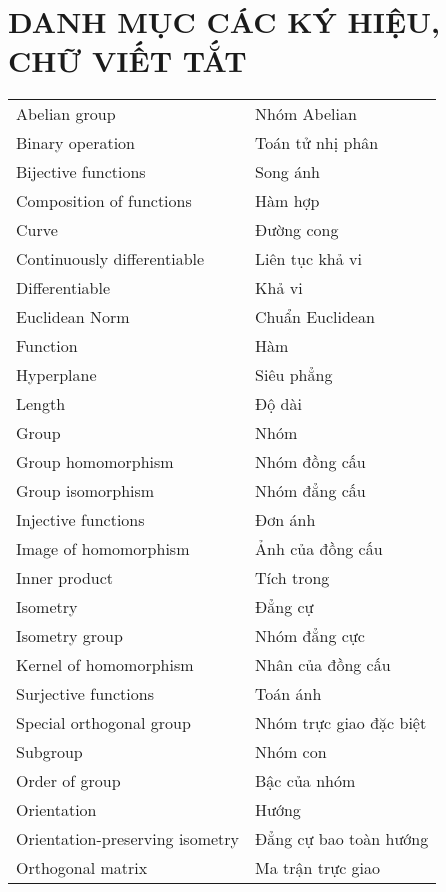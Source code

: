 \chapter*{DANH MỤC CÁC KÝ HIỆU, CHỮ VIẾT TẮT}
\begin{center}
	\begin{longtable}{ l  l }
            Abelian group & Nhóm Abelian\\
            Binary operation & Toán tử nhị phân\\
            Bijective functions & Song ánh\\
            Composition of functions & Hàm hợp\\
            Curve & Đường cong\\
            Continuously differentiable & Liên tục khả vi\\
            Differentiable & Khả vi\\
            Euclidean Norm & Chuẩn Euclidean\\
            Function & Hàm\\
            Hyperplane & Siêu phẳng\\
            Length & Độ dài\\
            Group & Nhóm\\
            Group homomorphism & Nhóm đồng cấu\\
            Group isomorphism & Nhóm đẳng cấu\\
            Injective functions & Đơn ánh \\
            Image of homomorphism & Ảnh của đồng cấu\\
            Inner product & Tích trong\\
            Isometry & Đẳng cự \\
            Isometry group & Nhóm đẳng cực\\
            Kernel of homomorphism & Nhân của đồng cấu\\
            Surjective functions & Toán ánh \\
            Special orthogonal group & Nhóm trực giao đặc biệt\\
            Subgroup & Nhóm con\\
            Order of group & Bậc của nhóm\\
            Orientation & Hướng\\
            Orientation-preserving isometry & Đẳng cự bao toàn hướng\\
            Orthogonal matrix & Ma trận trực giao\\

\end{longtable}
\end{center}
